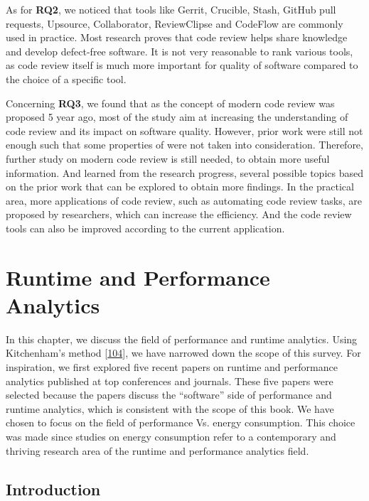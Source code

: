 \documentclass[]{book}
\begin{document}
As for \textbf{RQ2}, we noticed that tools like Gerrit, Crucible, Stash,
GitHub pull requests, Upsource, Collaborator, ReviewClipse and CodeFlow
are commonly used in practice. Most research proves that code review
helps share knowledge and develop defect-free software. It is not very
reasonable to rank various tools, as code review itself is much more
important for quality of software compared to the choice of a specific
tool.

Concerning \textbf{RQ3}, we found that as the concept of modern code
review was proposed 5 year ago, most of the study aim at increasing the
understanding of code review and its impact on software quality.
However, prior work were still not enough such that some properties of
were not taken into consideration. Therefore, further study on modern
code review is still needed, to obtain more useful information. And
learned from the research progress, several possible topics based on the
prior work that can be explored to obtain more findings. In the
practical area, more applications of code review, such as automating
code review tasks, are proposed by researchers, which can increase the
efficiency. And the code review tools can also be improved according to
the current application.

\chapter{Runtime and Performance
Analytics}\label{runtime-and-performance-analytics}

In this chapter, we discuss the field of performance and runtime
analytics. Using Kitchenham's method
{[}\protect\hyperlink{ref-kitchenham2004procedures}{104}{]}, we have
narrowed down the scope of this survey. For inspiration, we first
explored five recent papers on runtime and performance analytics
published at top conferences and journals. These five papers were
selected because the papers discuss the ``software'' side of performance
and runtime analytics, which is consistent with the scope of this book.
We have chosen to focus on the field of performance Vs. energy
consumption. This choice was made since studies on energy consumption
refer to a contemporary and thriving research area of the runtime and
performance analytics field.

\section{Introduction}\label{introduction-1}
\end{document}

